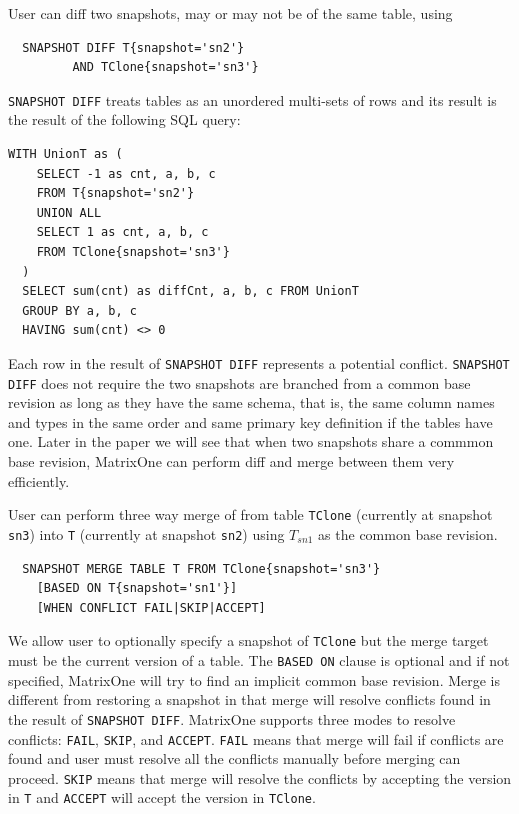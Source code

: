 \documentclass[sigconf,nonacm]{acmart} %
\begin{document}
User can diff two snapshots, may or may not be of the same table, using 
\begin{verbatim}
  SNAPSHOT DIFF T{snapshot='sn2'} 
         AND TClone{snapshot='sn3'}
\end{verbatim}  
\texttt{SNAPSHOT DIFF} treats tables as an unordered multi-sets of rows and its result 
is the result of the following SQL query:
\begin{lstlisting}[label=lst:diff,caption=SNAPSHOT DIFF Query]
  WITH UnionT as (
    SELECT -1 as cnt, a, b, c 
    FROM T{snapshot='sn2'}
    UNION ALL
    SELECT 1 as cnt, a, b, c 
    FROM TClone{snapshot='sn3'}
  )
  SELECT sum(cnt) as diffCnt, a, b, c FROM UnionT 
  GROUP BY a, b, c
  HAVING sum(cnt) <> 0
\end{lstlisting}
Each row in the result of \texttt{SNAPSHOT DIFF} represents a potential conflict.
\texttt{SNAPSHOT DIFF} does not require the two snapshots are branched from a 
common base revision as long as they have the same schema, that is, the same 
column names and types in the same order and same primary key definition 
if the tables have one.  Later in the paper we will see that when  
two snapshots share a commmon base revision, MatrixOne can perform diff and merge 
between them very efficiently.

User can perform three way merge of from table 
\texttt{TClone} (currently at snapshot \texttt{sn3}) 
into \texttt{T} (currently at snapshot \texttt{sn2}) 
using $T_{sn1}$ as the common base revision. 
\begin{verbatim}
  SNAPSHOT MERGE TABLE T FROM TClone{snapshot='sn3'}
    [BASED ON T{snapshot='sn1'}]
    [WHEN CONFLICT FAIL|SKIP|ACCEPT]
\end{verbatim}
We allow user to optionally specify a snapshot of \texttt{TClone} 
but the merge target must be the current version of a table.
The \texttt{BASED ON} clause is optional and if not specified, MatrixOne will try to 
find an implicit common base revision.  Merge is different from restoring a snapshot in 
that merge will resolve conflicts found in the result of \texttt{SNAPSHOT DIFF}.
MatrixOne supports three modes to resolve conflicts: \texttt{FAIL}, \texttt{SKIP}, 
and \texttt{ACCEPT}.  \texttt{FAIL} means that merge will fail if conflicts are found
and user must resolve all the conflicts manually before merging can proceed.  
\texttt{SKIP} means that merge will resolve the conflicts by accepting 
the version in \texttt{T} and \texttt{ACCEPT} will accept the version in \texttt{TClone}.  
\end{document}
